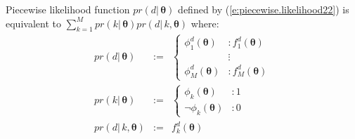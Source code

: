 \begin{proposition}
\label{pro:discrete}
Piecewise likelihood function $pr(d | \, \boldsymbol\theta)$ 
defined by (\ref{e:piecewise.likelihood22}) is equivalent to 
$\sum_{k = 1}^M pr(k | \, \boldsymbol\theta) pr(d | \, k, \boldsymbol\theta)$
where:
{\footnotesize
\begin{eqnarray}
pr(d | \, \boldsymbol\theta) &:=& 
\begin{cases}
\phi^d_1(\boldsymbol\theta)  &: f^d_1(\boldsymbol\theta)\\
									  &\vdots\\
\phi^d_M(\boldsymbol\theta)  &: f^d_M(\boldsymbol\theta)
\end{cases}
\label{e:piecewise.likelihood22}
\\
pr(k |\, \boldsymbol\theta) &:=& 
\begin{cases}
\phi_k(\boldsymbol\theta)  &: 1\\
\neg \phi_k(\boldsymbol\theta) &: 0
\end{cases}
\label{e:2rel22}
\\
pr(d | \, k, \boldsymbol\theta) &:=& f^d_k(\boldsymbol\theta)
\label{e:2rel222}
\end{eqnarray}
}
%
\end{proposition}


